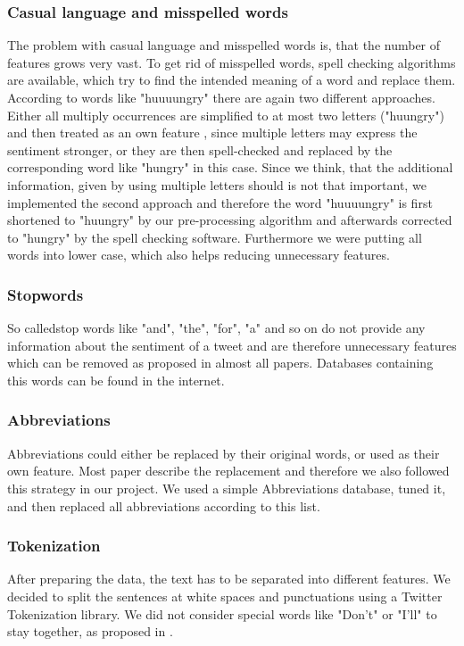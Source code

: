 \documentclass{sig-alternate}
\begin{document}
\subsubsection{Casual language and misspelled words}
The problem with casual language and misspelled words is, that the number of features grows very vast. To get rid of misspelled words, spell checking algorithms are available, which try to find the intended meaning of a word and replace them. According to words like "huuuungry" there are again two different approaches. Either all multiply occurrences are simplified to at most two letters ("huungry") and then treated as an own feature \cite{Anthony2010Twitter}, since multiple letters may express the sentiment stronger, or they are then spell-checked and replaced by the corresponding word like "hungry" in this case. Since we think, that the additional information, given by using multiple letters should is not that important, we implemented the second approach and therefore the word "huuuungry" is first shortened to "huungry" by our pre-processing algorithm and afterwards corrected to "hungry" by the spell checking software. Furthermore we were putting all words into lower case, which also helps reducing unnecessary features.

\subsubsection{Stopwords}
So calledstop words like "and", "the", "for", "a" and so on do not provide any information about the sentiment of a tweet and are therefore unnecessary features which can be removed as proposed in almost all papers. Databases containing this words can be found in the internet.

\subsubsection{Abbreviations}
Abbreviations could either be replaced by their original words, or used as their own feature. Most paper describe the replacement and therefore we also followed this strategy in our project. We used a simple Abbreviations database, tuned it, and then replaced all abbreviations according to this list.

\subsubsection{Tokenization}
After preparing the data, the text has to be separated into different features. We decided to split the sentences at white spaces and punctuations using a Twitter Tokenization library. We did not consider special words like "Don't" or "I'll" to stay together, as proposed in \cite{AlexanderTwitter}.
\end{document}
